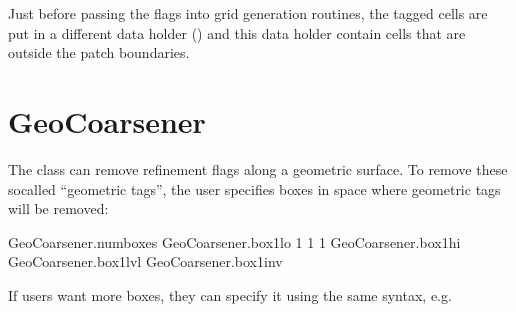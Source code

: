 \documentclass[letterpaper,10pt,english]{sphinxmanual}
\begin{document}
Just before passing the flags into  grid generation routines, the tagged cells are put in a different data holder () and this data holder  contain cells that are outside the patch boundaries.


\section{GeoCoarsener}
\label{\detokenize{Source/GeoCoarsener:geocoarsener}}\label{\detokenize{Source/GeoCoarsener:chap-geocoarsener}}\label{\detokenize{Source/GeoCoarsener::doc}}
The  class can remove refinement flags along a geometric surface.
To remove these so\sphinxhyphen{}called “geometric tags”, the user specifies boxes in space where geometric tags will be removed:

\begin{sphinxVerbatim}[commandchars=\\\{\},formatcom=\scriptsize]
GeoCoarsener.num\PYGZus{}boxes                
GeoCoarsener.box1\PYGZus{}lo      \PYGZhy{}1 \PYGZhy{}1 \PYGZhy{}1     
GeoCoarsener.box1\PYGZus{}hi                
GeoCoarsener.box1\PYGZus{}lvl                 
GeoCoarsener.box1\PYGZus{}inv             
\end{sphinxVerbatim}

If users want more boxes, they can specify it using the same syntax, e.g.
\end{document}
